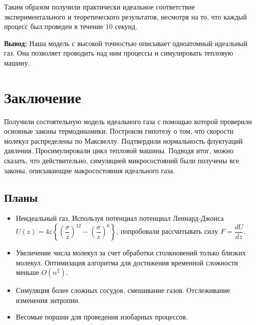 \documentclass[twoside,twocolumn, 11pt]{article}
\theoremstyle{plain}
\theoremstyle{definition}
\begin{document}
Таким образом получили практически идеальное соответствие экспериментального и теоретического результатов, несмотря на то, что
каждый процесс был проведен в течение $10$ секунд.

\textbf{Вывод:}
Наша модель с высокой точностью описывает одноатомный идеальный газ. Она позволяет проводить над ним процессы и симулировать тепловую машину.

\section{Заключение}
\indent Получили состоятельную модель идеального газа с помощью которой проверили основные законы термодинамики. Построили гипотезу о том,
что скорости молекул распределены по Максвеллу. Подтвердили нормальность флуктуаций давления. Просимулировали цикл тепловой машины.
Подводя итог, можно сказать, что действительно, симуляцией микросостояний были получены все законы, описывающие макросостояния идеального газа.

\subsection{Планы}
\begin{itemize}
\item Неидеальный газ.
Используя потенциал потенциал Леннард-Джонса $ U(z)=4 \varepsilon\left\{\left(\dfrac{\sigma}{z}\right)^{12}-\left(\dfrac{\sigma}{z}\right)^{6}\right\}$, попробовали
рассчитывать силу $F = \dfrac{dU}{dz}$.
\item Увеличение числа молекул за счет обработки столкновений только близких молекул. Оптимизация алгоритма для достижения временной сложности меньше $O(n^2)$.
\item Симуляция более сложных сосудов, смешивание газов. Отслеживание изменения энтропии.
\item Весомые поршни для проведения изобарных процессов.
\end{itemize}

\end{document}
